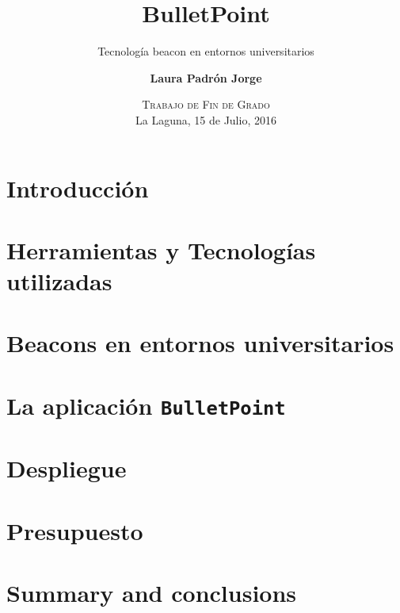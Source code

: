 \documentclass[blue,uncompressed]{beamer}
\title{\textbf{BulletPoint}}
\subtitle{Tecnología beacon en entornos universitarios}
\author[Laura Padrón Jorge]
{
	\textbf{Laura Padrón Jorge}
}
\institute[ULL]
\date[Trabajo de Fin de Grado]{\textsc{Trabajo de Fin de Grado}     \\
                           La Laguna, 15 de Julio, 2016}
\newcommand{\BulletPoint}{\texttt{BulletPoint{}}}
\begin{document}
	\begin{frame}[plain]
	\titlepage
	\end{frame}

		\section{Introducción}
			
		\section{Herramientas y Tecnologías utilizadas}
			
		\section{Beacons en entornos universitarios}
			
		\section{La aplicación \BulletPoint}
			
		\section{Despliegue}
			
		\section{Presupuesto}	
			
		\section{Summary and conclusions}
			
		
		
\end{document}
